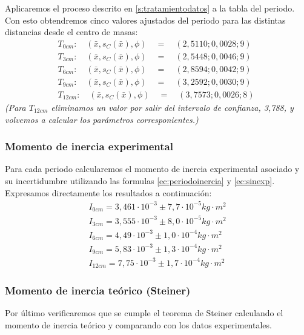 \documentclass[12pt, a4paper, titlepage]{article}
\begin{document}
  Aplicaremos el proceso descrito en \ref{s:tratamientodatos} a la tabla del periodo. Con esto obtendremos cinco valores ajustados del periodo para las distintas distancias desde el centro de masas:
  \begin{gather*}
    T_{0cm}: \quad (\bar{x}, s_C(\bar{x}), \phi) \quad = \quad (2,5110; 0,0028; 9) \\
    T_{3cm}: \quad (\bar{x}, s_C(\bar{x}), \phi) \quad = \quad (2,5448; 0,0046; 9) \\
    T_{6cm}: \quad (\bar{x}, s_C(\bar{x}), \phi) \quad = \quad (2,8594; 0,0042; 9) \\
    T_{9cm}: \quad (\bar{x}, s_C(\bar{x}), \phi) \quad = \quad (3,2592; 0,0030; 9) \\
    T_{12cm}: \quad (\bar{x}, s_C(\bar{x}), \phi) \quad = \quad (3,7573; 0,0026; 8) \;
  \end{gather*}
  \textit{(Para $T_{12cm}$ eliminamos un valor por salir del intervalo de confianza, 3,788, y volvemos a calcular los parámetros corresponientes.)}

  \subsubsection{Momento de inercia experimental}

  Para cada periodo calcularemos el momento de inercia experimental asociado y su incertidumbre utilizando las formulas \ref{ec:periodoinercia} y \ref{ec:sinexp}. Expresamos directamente los resultados a continuación:
  \begin{gather*}
    I_{0cm} = 3,461 \cdot 10^{-3} \pm 7,7 \cdot 10^{-5} kg \cdot m^2 \\
    I_{3cm} = 3,555 \cdot 10^{-3} \pm 8,0 \cdot 10^{-5} kg \cdot m^2 \\
    I_{6cm} = 4,49 \cdot 10^{-3} \pm 1,0 \cdot 10^{-4} kg \cdot m^2 \\
    I_{9cm} = 5,83 \cdot 10^{-3} \pm 1,3 \cdot 10^{-4} kg \cdot m^2 \\
    I_{12cm} = 7,75 \cdot 10^{-3} \pm 1,7 \cdot 10^{-4} kg \cdot m^2
  \end{gather*}

  \subsubsection{Momento de inercia teórico (Steiner)}

  Por último verificaremos que se cumple el teorema de Steiner calculando el momento de inercia teórico y comparando con los datos experimentales.
\end{document}
